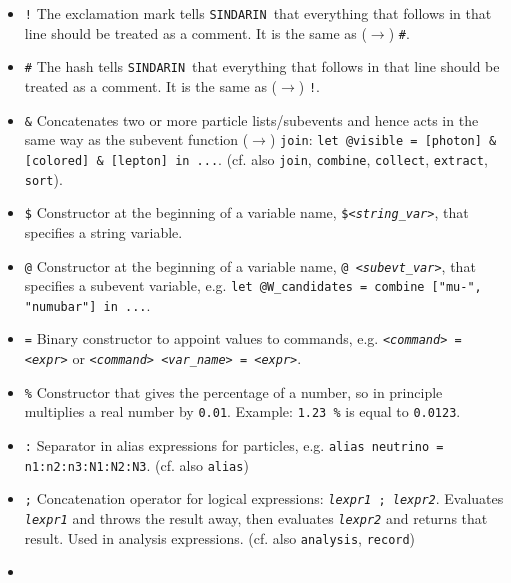 \documentclass[12pt]{book}
\newcommand{\ttt}[1]{\texttt{#1}}
\newcommand{\sindarin}{\ttt{SINDARIN}}
\begin{document}
\begin{itemize}
\item
\ttt{!} \newline
The exclamation mark tells \sindarin\ that everything that follows in
that line should be treated as a comment. It is the same as ($\to$)
\ttt{\#}.
\item
\ttt{\#} \newline
The hash tells \sindarin\ that everything that follows in
that line should be treated as a comment. It is the same as ($\to$)
\ttt{!}.
\item
\ttt{\&} \newline
Concatenates two or more particle lists/subevents and hence acts in
the same way as the subevent function ($\to$) \ttt{join}: \ttt{let
@visible = [photon] \& [colored] \& [lepton] in ...}. (cf. also
\ttt{join}, \ttt{combine}, \ttt{collect}, \ttt{extract}, \ttt{sort}).
\item
\ttt{\$} \newline
Constructor at the beginning of a variable name,
\ttt{\${\em <string\_var>}}, that specifies a string variable.
\item
\ttt{@} \newline
Constructor at the beginning of a variable name, \ttt{@{\em
<subevt\_var>}}, that specifies a subevent variable, e.g. \ttt{let
@W\_candidates = combine ["mu-", "numubar"] in ...}.
\item
\ttt{=} \newline
Binary constructor to appoint values to commands, e.g. \ttt{{\em <command>}
  = {\em <expr>}} or \newline \ttt{{\em <command>} {\em <var\_name>} =
  {\em <expr>}}.
\item
\ttt{\%} \newline
Constructor that gives the percentage of a number, so in
principle multiplies a real number by \ttt{0.01}. Example: \ttt{1.23
  \%} is equal to \ttt{0.0123}.
\item
\ttt{:} \newline
Separator in alias expressions for particles, e.g. \ttt{alias neutrino
  = n1:n2:n3:N1:N2:N3}. (cf. also \ttt{alias})
\item
\ttt{;} \newline
Concatenation operator for logical expressions: \ttt{{\em lexpr1} ;
  {\em lexpr2}}. Evaluates \ttt{{\em lexpr1}} and throws the result
away, then evaluates \ttt{{\em lexpr2}} and returns that result. Used
in analysis expressions. (cf. also \ttt{analysis}, \ttt{record})
\item

\end{itemize}
\end{document}
